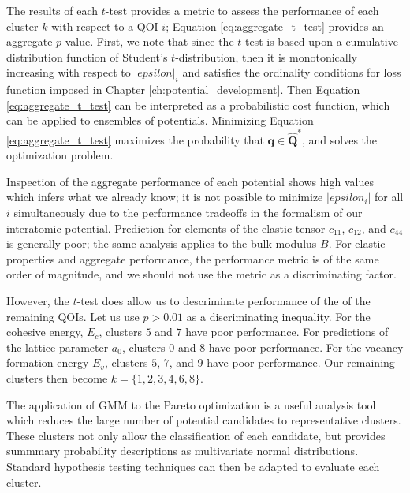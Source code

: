 The results of each $t$-test provides a metric to assess the performance of each cluster $k$ with respect to a QOI $i$; Equation \ref{eq:aggregate_t_test} provides an aggregate $p$-value.  First, we note that since the $t$-test is based upon a cumulative distribution function of Student's $t$-distribution, then it is monotonically increasing with respect to $|epsilon|_i$ and satisfies the ordinality conditions for loss function imposed in Chapter \ref{ch:potential_development}.  Then Equation \ref{eq:aggregate_t_test} can be interpreted as a probabilistic cost function, which can be applied to ensembles of potentials.
Minimizing Equation \ref{eq:aggregate_t_test} maximizes the probability that $\bm{q} \in \hat{\bm{Q}}^*$, and solves the optimization problem.

Inspection of the aggregate performance of each potential shows high values which infers what we already know; it is not possible to minimize $|epsilon_i|$ for all $i$ simultaneously due to the performance tradeoffs in the formalism of our interatomic potential.  Prediction for elements of the elastic tensor $c_{11}$, $c_{12}$, and $c_{44}$ is generally poor; the same analysis applies to the bulk modulus $B$.  For elastic properties and aggregate performance, the performance metric is of the same order of magnitude, and we should not use the metric as a discriminating factor.

  However, the $t$-test does allow us to descriminate performance of the of the remaining QOIs.  Let us use $p > 0.01$ as a discriminating inequality.  For the cohesive energy, $E_c$, clusters $5$ and $7$ have poor performance.  For predictions of the lattice parameter $a_0$, clusters $0$ and $8$ have poor performance.  For the vacancy formation energy $E_v$, clusters $5$, $7$, and $9$ have poor performance.  Our remaining clusters then become $k = \{1,2,3,4,6,8\}$.

The application of GMM to the Pareto optimization is a useful analysis tool which reduces the large number of potential candidates to representative clusters.  These clusters not only allow the classification of each candidate, but provides summmary probability descriptions as multivariate normal distributions.  Standard hypothesis testing techniques can then be adapted to evaluate each cluster.
